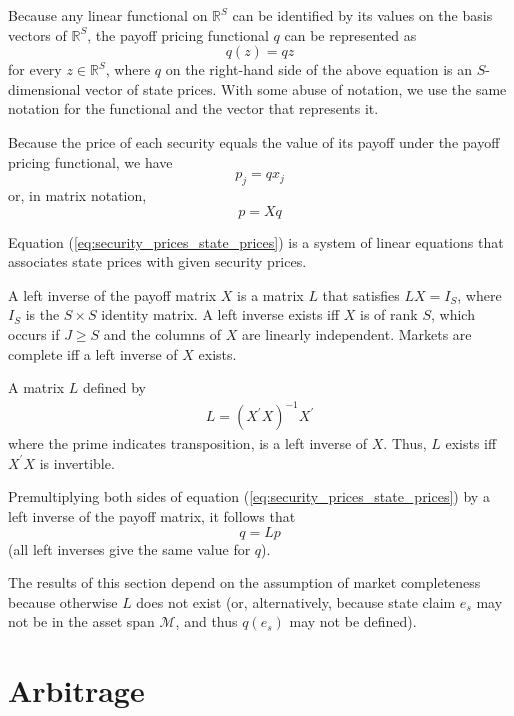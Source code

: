 \documentclass[\topdir/lecture\_notes.tex]{subfiles}
\begin{document}
Because any linear functional on \(\mathbb{R}^{S}\) can be identified by its values on the basis vectors of \(\mathbb{R}^{S}\), the payoff pricing functional \(q\) can be represented as
\begin{equation*}
q(z)=q z
\end{equation*}
for every \(z \in \mathbb{R}^{S}\), where \(q\) on the right-hand side of the above equation is an \(S\)-dimensional vector of state prices. With some abuse of notation, we use the same notation for the functional and the vector that represents it.

Because the price of each security equals the value of its payoff under the payoff pricing functional, we have
\begin{equation*}
p_{j}=q x_{j}
\end{equation*}
or, in matrix notation,
\begin{equation}
p=X q \label{eq:security_prices_state_prices}
\end{equation}

Equation (\ref{eq:security_prices_state_prices}) is a system of linear equations that associates state prices with given security prices.

A left inverse of the payoff matrix \(X\) is a matrix \(L\) that satisfies \(L X=I_{S}\), where \(I_{S}\) is the \(S \times S\) identity matrix. A left inverse exists iff \(X\) is of rank \(S\), which occurs if \(J \geq S\) and the columns of \(X\) are linearly independent. Markets are complete iff a left inverse of \(X\) exists.

A matrix \(L\) defined by
\begin{align*}
L=\left(X^{\prime} X\right)^{-1} X^{\prime} 
\end{align*}
where the prime indicates transposition, is a left inverse of \(X\). Thus, \(L\) exists iff \(X^{\prime} X\) is invertible.

Premultiplying both sides of equation (\ref{eq:security_prices_state_prices}) by a left inverse of the payoff matrix, it follows that
\begin{equation*}
q=L p
\end{equation*}
(all left inverses give the same value for \(q\)).

The results of this section depend on the assumption of market completeness because otherwise \(L\) does not exist (or, alternatively, because state claim \(e_{s}\) may not be in the asset span \(\mathcal{M}\), and thus \(q(e_{s})\) may not be defined).

\section{Arbitrage}
\end{document}
